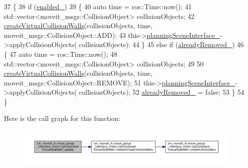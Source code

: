 \begin{DoxyCode}
37         \{
38             \textcolor{keywordflow}{if} (\hyperlink{classsm__moveit__4_1_1move__group__interface__client_1_1CpConstraintVirtualSideWall_a14d8cbbcc4b6f3fa158959b1eb1adc0f}{enabled\_})
39             \{
40                 \textcolor{keyword}{auto} time = ros::Time::now();
41                 std::vector<moveit\_msgs::CollisionObject> collisionObjects;
42                 \hyperlink{classsm__moveit__4_1_1move__group__interface__client_1_1CpConstraintVirtualSideWall_a43db5b598dd9ce057517188f2350f33d}{createVirtualCollisionWalls}(collisionObjects, time, 
      moveit\_msgs::CollisionObject::ADD);
43                 this->\hyperlink{classsm__moveit__4_1_1move__group__interface__client_1_1CpConstraintVirtualSideWall_aa31132f6c2b476dafde6825090309498}{planningSceneInterface\_}->applyCollisionObjects(
      collisionObjects);
44             \}
45             \textcolor{keywordflow}{else} \textcolor{keywordflow}{if} (\hyperlink{classsm__moveit__4_1_1move__group__interface__client_1_1CpConstraintVirtualSideWall_a5b11a3fcd2ead0a3ea7fe94fdec3747c}{alreadyRemoved\_})
46             \{
47                 \textcolor{keyword}{auto} time = ros::Time::now();
48                 std::vector<moveit\_msgs::CollisionObject> collisionObjects;
49 
50                 \hyperlink{classsm__moveit__4_1_1move__group__interface__client_1_1CpConstraintVirtualSideWall_a43db5b598dd9ce057517188f2350f33d}{createVirtualCollisionWalls}(collisionObjects, time, 
      moveit\_msgs::CollisionObject::REMOVE);
51                 this->\hyperlink{classsm__moveit__4_1_1move__group__interface__client_1_1CpConstraintVirtualSideWall_aa31132f6c2b476dafde6825090309498}{planningSceneInterface\_}->applyCollisionObjects(
      collisionObjects);
52                 \hyperlink{classsm__moveit__4_1_1move__group__interface__client_1_1CpConstraintVirtualSideWall_a5b11a3fcd2ead0a3ea7fe94fdec3747c}{alreadyRemoved\_} = \textcolor{keyword}{false};
53             \}
54         \}
\end{DoxyCode}
Here is the call graph for this function\+:
\nopagebreak
\begin{figure}[H]
\begin{center}
\leavevmode
\includegraphics[width=350pt]{classsm__moveit__4_1_1move__group__interface__client_1_1CpConstraintVirtualSideWall_a3a2636a6652706bc81721c0ce2d90643_cgraph}
\end{center}
\end{figure}
